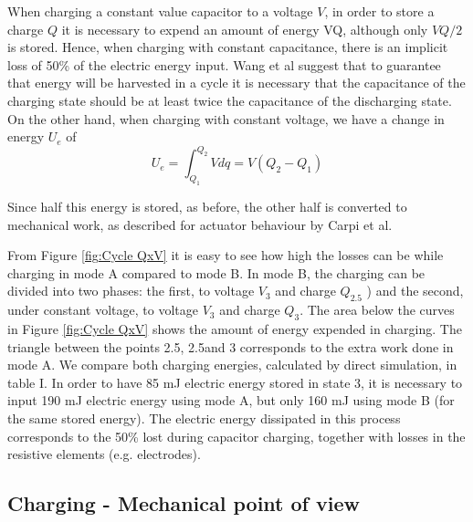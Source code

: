 When charging a constant value capacitor to a voltage $V$, in order to store a charge $Q$ it is necessary to expend an amount of energy VQ, although only $VQ/2$ is stored. Hence, when charging with constant capacitance, there is an implicit loss of 50\% of the electric energy input. Wang et al\cite{RN1} suggest that to guarantee that energy will be harvested in a cycle it is necessary that the capacitance of the charging state should be at least twice the capacitance of the discharging state.
On the other hand, when charging with constant voltage, we have a change in energy $U_e$ of
\begin{equation}
	U_e= \int_{Q_1}^{Q_2}V dq=V(Q_2-Q_1)	
\end{equation}

Since half this energy is stored, as before, the other half is converted to mechanical work, as described for actuator behaviour by Carpi et al\cite{RN43}. 

From Figure \ref{fig:Cycle QxV} it is easy to see how high the losses can be while charging in mode A compared to mode B. In mode B, the charging can be divided into two phases: the first, to voltage $V_3$ and charge $Q_2.5$ ) and the second, under constant voltage, to voltage $V_3$ and charge $Q_3$. The area below the curves in Figure \ref{fig:Cycle QxV} shows the amount of energy expended in charging. The triangle between the points 2.5\textquotesingle, 2.5\textquotedbl and 3 corresponds to the extra work done in mode A.
We compare both charging energies, calculated by direct simulation, in table I. In order to have 85 mJ electric energy stored in state 3, it is necessary to input 190 mJ electric energy using mode A, but only 160 mJ using mode B (for the same stored energy). The electric energy dissipated in this process corresponds to the 50\% lost during capacitor charging, together with losses in the resistive elements (e.g. electrodes).

\subsection{Charging - Mechanical point of view}
\label{subsec:charging}


